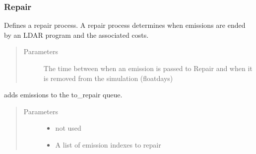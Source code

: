\documentclass[letterpaper,10pt,english]{sphinxmanual}
\begin{document}
\subsubsection{Repair}
\label{\detokenize{index:id1}}

\begin{fulllineitems}
\label{\detokenize{index:feast.DetectionModules.repair.Repair}}
Defines a repair process. A repair process determines when emissions are ended by an LDAR program and the
associated costs.
\begin{quote}\begin{description}
\item[{Parameters}] \leavevmode
{} \textendash{} The time between when an emission is passed to Repair and when it is removed from the
simulation (float\textendash{}days)

\end{description}\end{quote}

\begin{fulllineitems}
\label{\detokenize{index:feast.DetectionModules.repair.Repair.action}}
adds emissions to the to\_repair queue.
\begin{quote}\begin{description}
\item[{Parameters}] \leavevmode\begin{itemize}
\item {} 
 \textendash{} not used

\item {} 
 \textendash{} A list of emission indexes to repair

\end{itemize}


\end{description}
\end{quote}
\end{fulllineitems}
\end{fulllineitems}
\end{document}
